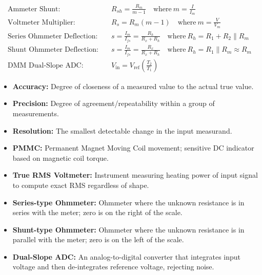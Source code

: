 \documentclass[12pt,a4paper]{article}
\begin{document}
\begin{tcolorbox}[formulabox, title={\textbf{Key Formulas at a Glance}}]
\begin{align*}
  \text{Ammeter Shunt:} \quad & R_{sh} = \frac{R_m}{m - 1} \quad \text{where} \ m = \frac{I}{I_m} \\
  \text{Voltmeter Multiplier:} \quad & R_s = R_m(m - 1) \quad \text{where} \ m = \frac{V}{V_m} \\
  \text{Series Ohmmeter Deflection:} \quad & s = \frac{I_m}{I_{fs}} = \frac{R_h}{R_x + R_h} \quad \text{where} \ R_h = R_1 + R_2 \parallel R_m \\
  \text{Shunt Ohmmeter Deflection:} \quad & s = \frac{I_m}{I_{fs}} = \frac{R_x}{R_x + R_h} \quad \text{where} \ R_h = R_1 \parallel R_m \approx R_m \\
  \text{DMM Dual-Slope ADC:} \quad & V_{\text{in}} = V_{\text{ref}} \left(\frac{T_2}{T_1}\right)
\end{align*}
\end{tcolorbox}

\begin{tcolorbox}[defbox, title={\textbf{One-Line Definitions}}]
\begin{itemize}[leftmargin=*, itemsep=2.5pt, topsep=0pt]
  \item \textbf{Accuracy:} Degree of closeness of a measured value to the actual true value.
  \item \textbf{Precision:} Degree of agreement/repeatability within a group of measurements.
  \item \textbf{Resolution:} The smallest detectable change in the input measurand.
  \item \textbf{PMMC:} Permanent Magnet Moving Coil movement; sensitive DC indicator based on magnetic coil torque.
  \item \textbf{True RMS Voltmeter:} Instrument measuring heating power of input signal to compute exact RMS regardless of shape.
  \item \textbf{Series-type Ohmmeter:} Ohmmeter where the unknown resistance is in series with the meter; zero is on the right of the scale.
  \item \textbf{Shunt-type Ohmmeter:} Ohmmeter where the unknown resistance is in parallel with the meter; zero is on the left of the scale.
  \item \textbf{Dual-Slope ADC:} An analog-to-digital converter that integrates input voltage and then de-integrates reference voltage, rejecting noise.
\end{itemize}
\end{tcolorbox}
\end{document}
